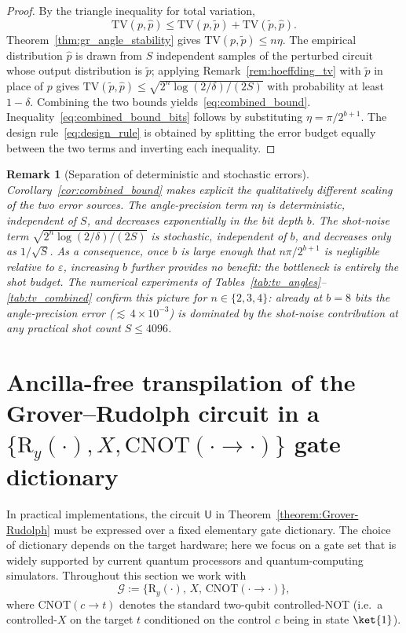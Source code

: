 \documentclass{article}
\newtheorem{remark}[theorem]{Remark}
\newcommand{\rU}{\mathsf{U}}
\newcommand{\RY}{\mathrm{R}_y}
\newcommand{\CNOT}{\mathrm{CNOT}}
\numberwithin{equation}{section}
\begin{document}
\begin{proof}
By the triangle inequality for total variation,
\[
\mathrm{TV}(p,\hat p)
\le
\mathrm{TV}(p,\widetilde p)
+
\mathrm{TV}(\widetilde p,\hat p).
\]
Theorem~\ref{thm:gr_angle_stability} gives
$\mathrm{TV}(p,\widetilde p)\le n\eta$.
The empirical distribution $\hat p$ is drawn from $S$ independent samples of
the perturbed circuit whose output distribution is $\widetilde p$; applying
Remark~\ref{rem:hoeffding_tv} with $\widetilde p$ in place of $p$ gives
$\mathrm{TV}(\widetilde p,\hat p)\le\sqrt{2^n\log(2/\delta)/(2S)}$ with
probability at least $1-\delta$.
Combining the two bounds yields~\eqref{eq:combined_bound}.
Inequality~\eqref{eq:combined_bound_bits} follows by substituting $\eta=\pi/2^{b+1}$.
The design rule~\eqref{eq:design_rule} is obtained by splitting the error budget
equally between the two terms and inverting each inequality.
\end{proof}

\begin{remark}[Separation of deterministic and stochastic errors]
\label{rem:separation}
Corollary~\ref{cor:combined_bound} makes explicit the qualitatively different
scaling of the two error sources.
The angle-precision term $n\eta$ is \emph{deterministic}, independent of $S$,
and decreases \emph{exponentially} in the bit depth $b$.
The shot-noise term $\sqrt{2^n\log(2/\delta)/(2S)}$ is \emph{stochastic},
independent of $b$, and decreases only as $1/\sqrt{S}$.
As a consequence, once $b$ is large enough that $n\pi/2^{b+1}$ is negligible
relative to $\varepsilon$, increasing $b$ further provides no benefit: the bottleneck
is entirely the shot budget.
The numerical experiments of Tables~\ref{tab:tv_angles}--\ref{tab:tv_combined}
confirm this picture for $n\in\{2,3,4\}$: already at $b=8$ bits the
angle-precision error (${\lesssim}\,4\times10^{-3}$) is dominated by the shot-noise
contribution at any practical shot count $S\le 4096$.
\end{remark}



\section{Ancilla-free transpilation of the Grover--Rudolph circuit in a $\{\RY(\cdot),X,\CNOT(\cdot\to\cdot)\}$ gate dictionary}
\label{sec:transpilation_triangulum}

In practical implementations, the circuit $\rU$ in
Theorem~\ref{theorem:Grover-Rudolph} must be expressed over a fixed elementary gate dictionary.
The choice of dictionary depends on the target hardware; here we focus on a gate set that is
widely supported by current quantum processors and quantum-computing simulators.
Throughout this section we work with
\[
\mathcal{G}:=\{\RY(\cdot),\,X,\,\CNOT(\cdot\to\cdot)\},
\]
where $\CNOT(c\to t)$ denotes the standard two-qubit controlled-NOT (i.e.\ a controlled-$X$ on the target $t$
conditioned on the control $c$ being in state $\ket{1}$).
\end{document}
